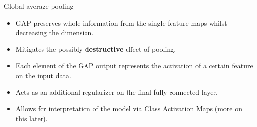 \begin{vbframe}{Global average pooling}
    \begin{itemize}
        \item GAP preserves whole information from the single feature maps whilst decreasing the dimension.
        \item Mitigates the possibly \textbf{destructive} effect of pooling.
        \item Each element of the GAP output represents the activation of a certain feature on the input data.
        \item Acts as an additional regularizer on the final fully connected layer.
        \item Allows for interpretation of the model via Class Activation Maps (more on this later).
    \end{itemize}

\end{vbframe}


